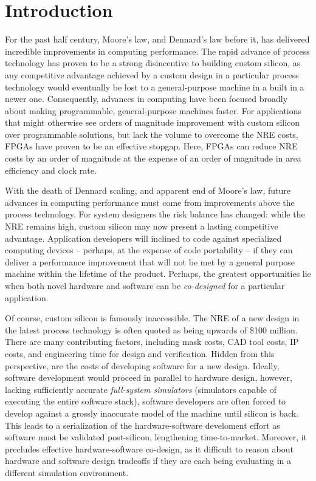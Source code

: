 \chapter{Introduction}

For the past half century, Moore's law, and Dennard's law before it, has
delivered incredible improvements in computing performance. The rapid advance
of process technology has proven to be a strong disincentive to building custom
silicon, as any competitive advantage achieved by a custom design in a
particular process technology would eventually be lost to a general-purpose
machine in a built in a newer one. Consequently, advances in computing have
been focused broadly about making programmable, general-purpose machines
faster. For applications that might otherwise see orders of magnitude
improvement with custom silicon over programmable solutions, but lack the
volume to overcome the NRE costs, FPGAs have proven to be an effective stopgap.
Here, FPGAs can reduce NRE costs by an order of magnitude at the expense of an
order of magnitude in area efficiency and clock rate.

With the death of Dennard scaling, and apparent end of Moore’s law, future
advances in computing performance must come from improvements above the process
technology.  For system designers the risk balance has changed: while the NRE
remains high, custom silicon may now present a lasting competitive advantage.
Application developers will inclined to code against specialized computing
devices -- perhaps, at the expense of code portability -- if they can deliver a
performance improvement that will not be met by a general purpose machine
within the lifetime of the product. Perhaps, the greatest opportunities lie when
both novel hardware and software can be \textit{co-designed} for a particular
application.

Of course, custom silicon is famously inaccessible. The NRE of a new design in
the latest process technology is often quoted as being upwards of \$100
million.  There are many contributing factors, including mask costs, CAD tool
costs, IP costs, and engineering time for design and verification. Hidden from
this perspective, are the costs of developing software for a new design.
Ideally, software development would proceed in parallel to hardware design,
however, lacking sufficiently accurate \textit{full-system simulators} (simulators capable
of executing the entire software stack), software developers are often forced to
develop against a grossly inaccurate model of the machine until silicon is
back. This leads to a serialization of the hardware-software develoment effort
as software must be validated post-silicon, lengthening time-to-market.
Moreover, it precludes effective hardware-software co-design, as it difficult
to reason about hardware and software design tradeoffs if they are each being
evaluating in a different simulation environment.

